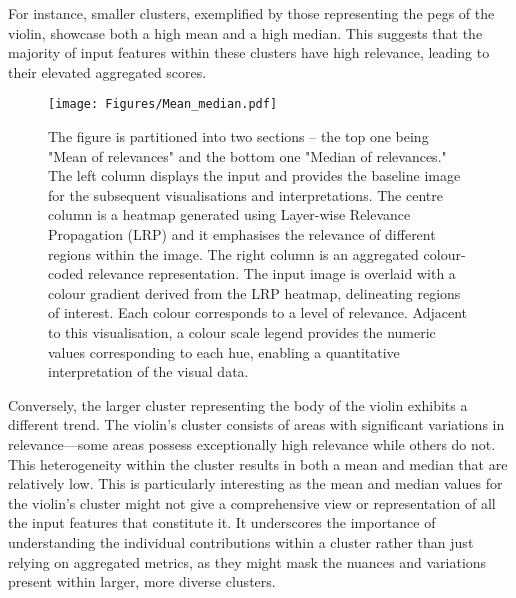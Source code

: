 For instance, smaller clusters, exemplified by those representing the pegs of the violin, showcase both a high mean and a high median. This suggests that the majority of input features within these clusters have high relevance, leading to their elevated aggregated scores.

\begin{figure}[ht!]
	\begin{center}
		\texttt{[image: Figures/Mean\_median.pdf]}
	\end{center}
	\caption{The figure is partitioned into two sections -- the top one being "Mean of relevances" and  the bottom one "Median of relevances." The left column displays the input and provides the baseline image for the subsequent visualisations and interpretations. The centre column is a heatmap generated using Layer-wise Relevance Propagation (LRP) and it emphasises the relevance of different regions within the image. The right column is an aggregated colour-coded relevance representation. The input image is overlaid with a colour gradient derived from the LRP heatmap, delineating regions of interest. Each colour corresponds to a level of relevance. Adjacent to this visualisation, a colour scale legend provides the numeric values corresponding to each hue, enabling a quantitative interpretation of the visual data.}
	\label{Fig:aggregating}
\end{figure} 

Conversely, the larger cluster representing the body of the violin exhibits a different trend. The violin's cluster consists of areas with significant variations in relevance—some areas possess exceptionally high relevance while others do not. This heterogeneity within the cluster results in both a mean and median that are relatively low. This is particularly interesting as the mean and median values for the violin's cluster might not give a comprehensive view or representation of all the input features that constitute it. It underscores the importance of understanding the individual contributions within a cluster rather than just relying on aggregated metrics, as they might mask the nuances and variations present within larger, more diverse clusters.


